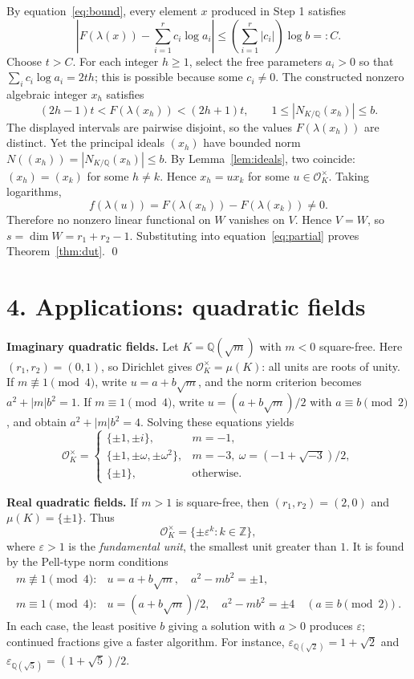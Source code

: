 \documentclass[11pt]{article}
\newcommand{\OK}{\mathcal O_K}
\newcommand{\Z}{\mathbb Z}
\newcommand{\Q}{\mathbb Q}
\newcommand{\Nm}{N_{K/\Q}}
\begin{document}
By equation~\eqref{eq:bound}, every element $x$ produced in Step 1 satisfies
\begin{equation}\label{eq:linbound}
\left|F(\lambda(x))-\sum_{i=1}^r c_i\log a_i\right|
\le\left(\sum_{i=1}^r|c_i|\right)\log b=:C.
\end{equation}
Choose $t>C$. For each integer $h\ge1$, select the free parameters $a_i>0$ so that
$\sum_i c_i\log a_i=2th$; this is possible because some $c_i\ne0$. The constructed nonzero algebraic integer $x_h$ satisfies
\[
(2h-1)t<F(\lambda(x_h))<(2h+1)t,\qquad 1\le|\Nm(x_h)|\le b.
\]
The displayed intervals are pairwise disjoint, so the values $F(\lambda(x_h))$ are distinct. Yet the principal ideals $(x_h)$ have bounded norm $N((x_h))=|\Nm(x_h)|\le b$. By Lemma~\ref{lem:ideals}, two coincide: $(x_h)=(x_k)$ for some $h\ne k$. Hence $x_h=ux_k$ for some $u\in\OK^\times$. Taking logarithms,
\[
f(\lambda(u))=F(\lambda(x_h))-F(\lambda(x_k))\ne0.
\]
Therefore no nonzero linear functional on $W$ vanishes on $V$. Hence $V=W$, so $s=\dim W=r_1+r_2-1$. Substituting into equation~\eqref{eq:partial} proves Theorem~\ref{thm:dut}. \qed

\section*{4. Applications: quadratic fields}
\textbf{Imaginary quadratic fields.} Let $K=\Q(\sqrt m)$ with $m<0$ square-free. Here $(r_1,r_2)=(0,1)$, so Dirichlet gives $\OK^\times=\mu(K)$: all units are roots of unity. If $m\not\equiv1\pmod4$, write $u=a+b\sqrt m$, and the norm criterion becomes $a^2+|m|b^2=1$. If $m\equiv1\pmod4$, write $u=(a+b\sqrt m)/2$ with $a\equiv b\pmod2$, and obtain $a^2+|m|b^2=4$. Solving these equations yields
\[
\boxed{\OK^\times=\begin{cases}
\{\pm1,\pm i\},&m=-1,\\
\{\pm1,\pm\omega,\pm\omega^2\},&m=-3,\ \omega=(-1+\sqrt{-3})/2,\\
\{\pm1\},&\text{otherwise}.
\end{cases}}
\]

\textbf{Real quadratic fields.} If $m>1$ is square-free, then $(r_1,r_2)=(2,0)$ and $\mu(K)=\{\pm1\}$. Thus
\[
\boxed{\OK^\times=\{\pm\varepsilon^k:k\in\Z\},}
\]
where $\varepsilon>1$ is the \emph{fundamental unit}, the smallest unit greater than $1$. It is found by the Pell-type norm conditions
\[
\begin{array}{ll}
 m\not\equiv1\pmod4:&u=a+b\sqrt m,\quad a^2-mb^2=\pm1,\\[2pt]
 m\equiv1\pmod4:&u=(a+b\sqrt m)/2,\quad a^2-mb^2=\pm4
 \quad(a\equiv b\!\!\pmod2).
\end{array}
\]
In each case, the least positive $b$ giving a solution with $a>0$ produces $\varepsilon$; continued fractions give a faster algorithm. For instance, $\varepsilon_{\Q(\sqrt2)}=1+\sqrt2$ and $\varepsilon_{\Q(\sqrt5)}=(1+\sqrt5)/2$.
\end{document}
